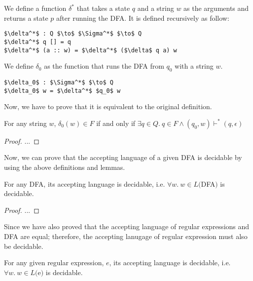 \begin{defn}
\noindent We define a function \(\delta^*\) that takes a state \(q\) and
a string \(w\) as the arguments and returns a state \(p\) after
running the DFA. It is defined recursively as follow: 
\begin{lstlisting}[mathescape=true,xleftmargin=.3\textwidth]
$\delta^*$ : Q $\to$ $\Sigma^*$ $\to$ Q
$\delta^*$ q [] = q
$\delta^*$ (a :: w) = $\delta^*$ ($\delta$ q a) w
\end{lstlisting}
\end{defn}

\begin{defn}
\noindent We define \(\delta_0\) as the function that runs the DFA
from \(q_0\) with a string \(w\). 
\begin{lstlisting}[mathescape=true,xleftmargin=.3\textwidth]
$\delta_0$ : $\Sigma^*$ $\to$ Q
$\delta_0$ w = $\delta^*$ $q_0$ w
\end{lstlisting}
\end{defn}

\par Now, we have to prove that it is equivalent to the original
definition. 

\begin{lem}
\noindent For any string
\(w\), \(\delta_0 (w) \in F\) if and only if \(\exists q\in Q.\ q
\in F \wedge (q_0,w) \vdash^* (q,\epsilon)\)
\end{lem}

\begin{proof}
\noindent ...
\end{proof}


\par Now, we can prove that the accepting language of a given DFA is
decidable by using the above definitions and lemmas. 

\begin{thm}
\noindent For any DFA, its accepting language is decidable,
i.e. \(\forall w.\ w \in L(\)DFA\()\) is decidable. 
\end{thm}

\begin{proof}
\noindent ...
\end{proof}

\par Since we have also proved that the accepting language of regular
expressions and DFA are equal; therefore, the accepting lanugage of
regular expression must also be decidable. 

\begin{thm}
\noindent For any given regular expression, \(e\), its accepting language is
decidable, i.e. \(\forall w.\ w \in L(\)e\()\) is decidable. 
\end{thm}

